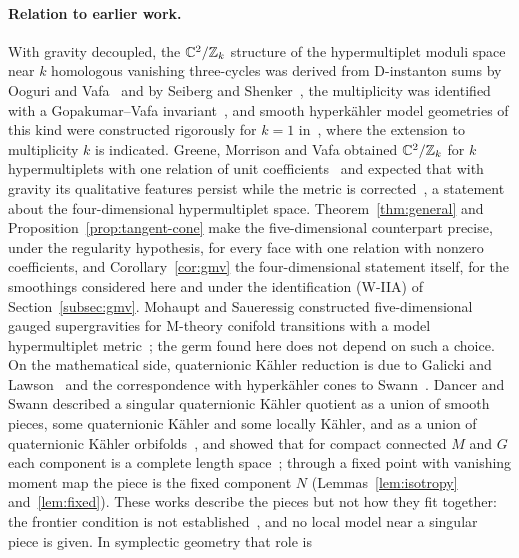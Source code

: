 \paragraph{Relation to earlier work.}
With gravity decoupled, the $\mathbb C^2/\mathbb Z_k$ structure of the hypermultiplet moduli space near $k$
homologous vanishing three-cycles was derived from D-instanton sums by Ooguri and
Vafa~\cite{OoguriVafa:1996} and by Seiberg and Shenker~\cite{SeibergShenker:1996}, the
multiplicity was identified with a Gopakumar--Vafa invariant~\cite{SaueressigVandoren:2007}, and
smooth hyperk\"ahler model geometries of this kind were constructed rigorously for $k=1$
in~\cite{FredricksonZimet:2025}, where the extension to multiplicity $k$ is indicated. Greene, Morrison and Vafa obtained $\mathbb C^2/\mathbb Z_k$ for $k$
hypermultiplets with one relation of unit coefficients~\cite[Sect.~3, eqs.~(3.13)--(3.18)]{Greene:1996Confinement}
and expected that with gravity its qualitative features persist while the metric is
corrected~\cite[Sect.~6]{Greene:1996Confinement}, a statement about the four-dimensional
hypermultiplet space. Theorem~\ref{thm:general} and Proposition~\ref{prop:tangent-cone} make
the five-dimensional counterpart precise, under the regularity hypothesis, for every face with
one relation with nonzero coefficients, and Corollary~\ref{cor:gmv} the four-dimensional statement
itself, for the smoothings considered here and under the identification (W-IIA) of
Section~\ref{subsec:gmv}. Mohaupt and Saueressig constructed five-dimensional
gauged supergravities for M-theory conifold transitions with a model hypermultiplet
metric~\cite{Mohaupt:2004de}; the germ found here does not depend on such a choice. On the mathematical side, quaternionic K\"ahler reduction is due to Galicki and
Lawson~\cite{Galicki:1988} and the correspondence with hyperk\"ahler cones to
Swann~\cite{Swann:1991}. Dancer and Swann described a singular quaternionic K\"ahler quotient as a
union of smooth pieces, some quaternionic K\"ahler and some locally K\"ahler, and as a union of
quaternionic K\"ahler orbifolds~\cite[Thm.~4.6, Props.~4.4 and~5.1, Thm.~6.1]{DancerSwann:1997}, and
showed that for compact connected $M$ and $G$ each component is a complete length space~\cite[Thm.~7.1]{DancerSwann:1997};
through a fixed point with vanishing moment map the piece is the fixed component $N$
(Lemmas~\ref{lem:isotropy} and~\ref{lem:fixed}). These works describe the pieces but not how they fit
together: the frontier condition is not established~\cite[Sect.~2]{DancerSwann:1997}, and no local
model near a singular piece is given. In symplectic geometry that role is
